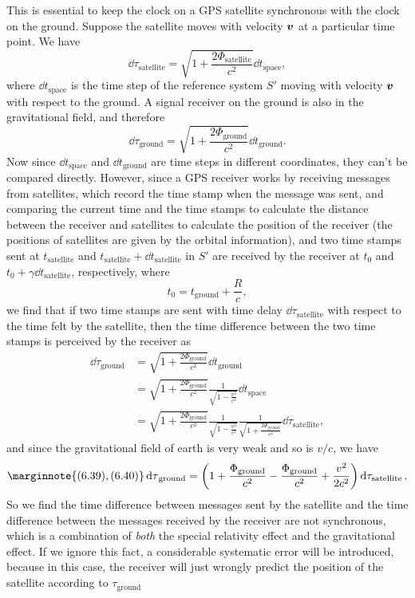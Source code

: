 \documentclass[hyperref, a4paper]{article}
\begin{document}
This is essential to keep the clock on a GPS satellite synchronous with the clock on the ground. 
Suppose the satellite moves with velocity $\vb*{v}$ at a particular time point. We have 
\[
    \dd{\tau_\text{satellite}} = \sqrt{1 + \frac{2 \Phi_\text{satellite}}{c^2}} \dd{t}_\text{space},
\]
where $\dd{t_\text{space}}$ is the time step of the reference system $S'$ moving with velocity $\vb*{v}$ with respect 
to the ground. A signal receiver on the ground is also in the gravitational field, and therefore 
\[
    \dd{\tau_\text{ground}} = \sqrt{1 + \frac{2 \Phi_\text{ground}}{c^2}} \dd{t_\text{ground}}.
\]
Now since $\dd{t_\text{space}}$ and $\dd{t_\text{ground}}$ are time steps in different coordinates, 
they can't be compared directly. However, since a GPS receiver works by receiving messages from satellites,
which record the time stamp when the message was sent, and comparing the current time and the time stamps 
to calculate the distance between the receiver and satellites to calculate the position of the receiver (the 
positions of satellites are given by the orbital information), and two time stamps sent at $t_\text{satellite}$ and
$t_\text{satellite} + \dd{t_\text{satellite}}$ in $S'$ are received by the receiver at $t_0$ and 
$t_0 + \gamma \dd{t_\text{satellite}}$, respectively, where 
\begin{equation}
    t_0 = t_\text{ground} + \frac{R}{c},
    \label{eq:time-to-r-gps}
\end{equation}
we find that if two time stamps are sent with time delay $\dd{\tau_\text{satellite}}$ with respect to the time 
felt by the satellite, then the time difference between the two time stamps is perceived by the receiver as 
\[
    \begin{aligned}
        \dd{\tau_\text{ground}} &= \sqrt{1 + \frac{2 \Phi_\text{ground}}{c^2}} \dd{t_\text{ground}} \\
        &=  \sqrt{1 + \frac{2 \Phi_\text{ground}}{c^2}} \frac{1}{\sqrt{1 - \frac{v^2}{c^2}}} \dd{t_\text{space}} \\
        &= \sqrt{1 + \frac{2 \Phi_\text{ground}}{c^2}} \frac{1}{\sqrt{1 - \frac{v^2}{c^2}}} \frac{1}{\sqrt{1 + \frac{2 \Phi_\text{ground}}{c^2}} } \dd{\tau_\text{satellite}} ,
    \end{aligned}
\]
and since the gravitational field of earth is very weak and so is $v / c$, we have 
\begin{equation} \marginnote{(6.39), (6.40)}
    \dd{\tau}_\text{ground} = \left( 1 + \frac{\Phi_\text{ground}}{c^2} - \frac{\Phi_\text{ground}}{c^2} + \frac{v^2}{2 c^2} \right) \dd{\tau_\text{satellite}}.
\end{equation}
So we find the time difference between messages sent by the satellite and the time difference between the 
messages received by the receiver are not synchronous, which is a combination of \emph{both} the special 
relativity effect and the gravitational effect. If we ignore this fact, a considerable systematic error will 
be introduced, because in this case, the receiver will just wrongly predict the position of the satellite
according to $\tau_\text{ground}$ 
\end{document}
